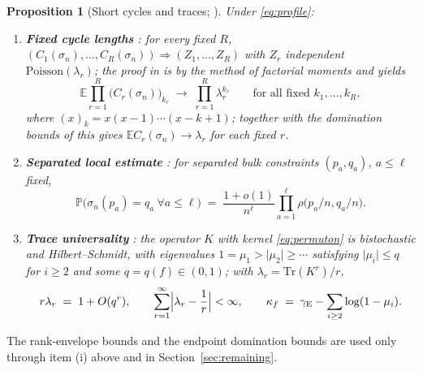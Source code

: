 \documentclass[11pt]{article}
\newcommand{\E}{\mathbb{E}}
\newcommand{\Prob}{\mathbb{P}}
\newcommand{\1}{\mathbf{1}}
\newcommand{\Tr}{\mathrm{Tr}}
\newcommand{\Poisson}{\mathrm{Poisson}}
\newcommand{\gE}{\gamma_{\mathrm{E}}}
\newtheorem{proposition}[theorem]{Proposition}
\theoremstyle{remark}
\begin{document}
\begin{proposition}[Short cycles and traces; \cite{Lon26}]\label{prop:short}
Under \eqref{eq:profile}:
\begin{enumerate}[label=(\roman*)]
\item \textbf{Fixed cycle lengths} \cite[Theorem~5.1]{Lon26}: for every fixed
$R$, $(C_1(\sigma_n),\dots,C_R(\sigma_n))\Rightarrow(Z_1,\dots,Z_R)$ with
$Z_r$ independent $\Poisson(\lambda_r)$; the proof in \cite{Lon26} is by the
method of factorial moments and yields
\begin{equation}\label{eq:fixed-fm}
\E\prod_{r=1}^R\bigl(C_r(\sigma_n)\bigr)_{k_r}\;\longrightarrow\;
\prod_{r=1}^R\lambda_r^{k_r}\qquad\text{for all fixed }k_1,\dots,k_R,
\end{equation}
where $(x)_k=x(x-1)\cdots(x-k+1)$; together with the domination bounds of
\cite[Lemmas~5.8--5.13]{Lon26} this gives $\E C_r(\sigma_n)\to\lambda_r$ for
each fixed $r$.
\item \textbf{Separated local estimate} \cite[Proposition~5.7]{Lon26}: for
separated bulk constraints $(p_a,q_a)$, $a\le\ell$ fixed,
\begin{equation}\label{eq:separated}
\Prob\bigl(\sigma_n(p_a)=q_a\ \forall a\le\ell\bigr)
\;=\;\frac{1+o(1)}{n^\ell}\prod_{a=1}^\ell \rho\bigl(p_a/n,q_a/n\bigr).
\end{equation}
\item \textbf{Trace universality} \cite[Theorem~5.19, Lemmas~5.17--5.18]
{Lon26}: the operator $K$ with kernel \eqref{eq:permuton} is bistochastic and
Hilbert--Schmidt, with eigenvalues $1=\mu_1>\lvert\mu_2\rvert\ge\cdots$
satisfying $\lvert\mu_i\rvert\le q$ for $i\ge2$ and some $q=q(f)\in(0,1)$;
with $\lambda_r=\Tr(K^r)/r$,\begin{equation}\label{eq:trace-gap}
r\lambda_r\;=\;1+O(q^r),\qquad
\sum_{r=1}^\infty\Bigl|\lambda_r-\frac1r\Bigr|<\infty,\qquad
\kappa_f\;=\;\gE-\sum_{i\ge2}\log(1-\mu_i).
\end{equation}
\end{enumerate}
\end{proposition}

The rank-envelope bounds \cite[Lemmas~5.8--5.10]{Lon26} and the endpoint
domination bounds \cite[Lemmas~5.11--5.13]{Lon26} are used only through item
(i) above and in Section~\ref{sec:remaining}.
\end{document}
